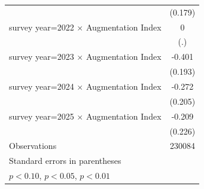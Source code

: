 \begin{table}[htbp]
\begin{tabular}{l*{1}{c}}
                    &     (0.179)         \\
\addlinespace
survey year=2022 $\times$ Augmentation Index&           0         \\
                    &         (.)         \\
\addlinespace
survey year=2023 $\times$ Augmentation Index&      -0.401\sym{**} \\
                    &     (0.193)         \\
\addlinespace
survey year=2024 $\times$ Augmentation Index&      -0.272         \\
                    &     (0.205)         \\
\addlinespace
survey year=2025 $\times$ Augmentation Index&      -0.209         \\
                    &     (0.226)         \\
\midrule
Observations        &      230084         \\
\bottomrule
\multicolumn{2}{l}{\footnotesize Standard errors in parentheses}\\
\multicolumn{2}{l}{\footnotesize \sym{*} \(p<0.10\), \sym{**} \(p<0.05\), \sym{***} \(p<0.01\)}\\
\end{tabular}
\end{table}
